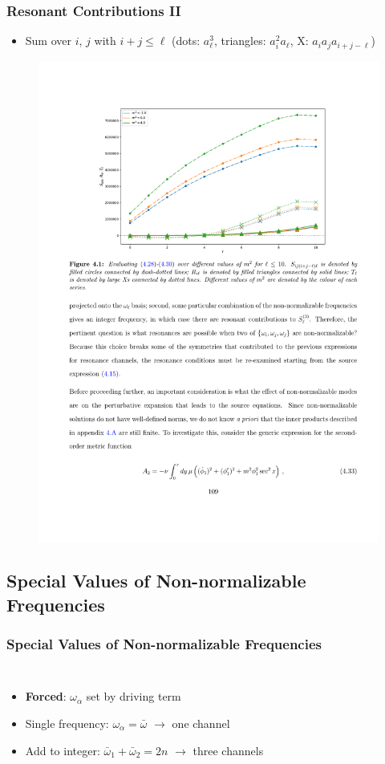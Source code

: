 \documentclass[mathserif,10pt]{beamer}
\newcommand{\bi}{\begin{itemize}}
\newcommand{\ei}{\end{itemize}}
\newcommand{\its}{\item}
\begin{document}
{\frame
{
   \frametitle{Resonant Contributions II} 
   \bi
   \its Sum over $i$, $j$ with $i + j \leq \ell$ (dots: $a_\ell^3$, triangles: $a_i^2 a_\ell$, X: $a_i a_j a_{i + j -\ell}$)
   \ei
   \begin{figure}
   \centering
    \includegraphics[scale=0.75]{norm} 
    \end{figure}
}
   


\subsection{Special Values of Non-normalizable Frequencies}
\frame
{
  \frametitle{Special Values of Non-normalizable Frequencies}
  \begin{columns}
  \bi
  \its {\bf Forced}: $\omega_\alpha$ set by driving term
  \its\alert<1>{Single frequency}: $\omega_\alpha = \bar\omega$ $\to$ one channel
  \its<2->{\alert<2>{Add to integer}: $\bar\omega_1 + \bar\omega_2 = 2n$ $\to$ three channels}
  \ei


\end{columns}}}
\end{document}
